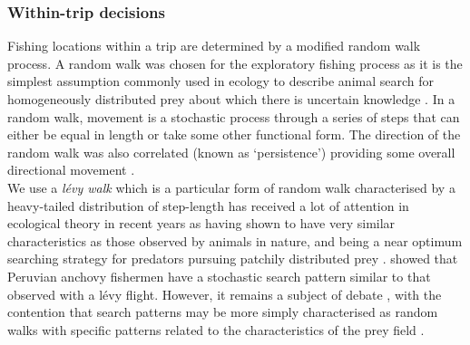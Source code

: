 \documentclass[review]{elsarticle}
\begin{document}
\subsubsection{Within-trip decisions}

Fishing locations within a trip are  determined by a
modified random walk process.  A random walk was chosen for the exploratory fishing
process as it is the simplest assumption commonly used in ecology to describe
 animal
search for 
homogeneously distributed prey about which there is uncertain knowledge
\citep{Viswanathan1999}. In a random walk, movement is a stochastic process
through a series of steps that can either be equal in length or take some other
functional form. The direction of the random walk was also correlated (known as
`persistence') providing some overall directional
movement \citep{Codling2008}. \\

We use a \textit{ {lévy walk}} which is a
particular form of random walk characterised by a heavy-tailed distribution of
step-length has received a lot of
attention in ecological theory in recent years as having shown to have very
similar characteristics as those observed by animals in nature, and being a
near optimum searching strategy for predators pursuing patchily distributed
prey \citep{Viswanathan1999, Bartumeus2005, Sims2008}.  \citet{Bertrand2007}
showed that Peruvian anchovy fishermen have a stochastic search pattern similar
to that observed with a lévy flight. However, it remains a subject of debate
, with the
contention that search patterns may be more simply characterised as random
walks \citep{Sakiyama2013} with specific patterns related to the
characteristics of the prey field \citep{Sims2012}. \\
\end{document}
